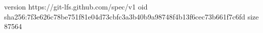 version https://git-lfs.github.com/spec/v1
oid sha256:7f3e626c78be751f81e04d73cbfc3a3b40b9a98748f4b13f6cec73b661f7c6fd
size 87564
